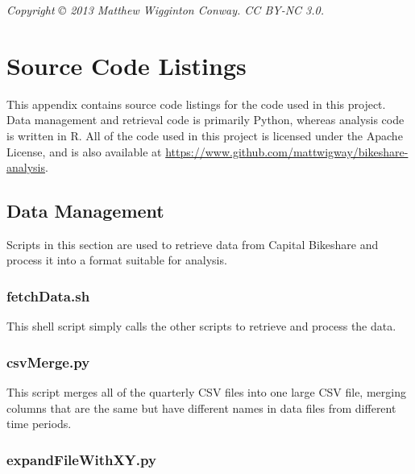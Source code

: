 \documentclass[letterpaper,11pt]{article}
\begin{document}
\clearpage\newpage
\printbibliography

\vspace{25em}

\emph{Copyright © 2013 Matthew Wigginton Conway. CC BY-NC 3.0.}

\newpage
{}
\fancyhfoffset[E,O]{0pt}
\appendix
\section{Source Code Listings}

This appendix contains source code listings for the code used in this
project. Data management and retrieval code is primarily Python,
whereas analysis code is written in R. All of the code used in this
project is licensed under the Apache License, and is also available at
\url{https://www.github.com/mattwigway/bikeshare-analysis}.

\subsection{Data Management}

Scripts in this section are used to retrieve data from Capital
Bikeshare and process it into a format suitable for analysis.

\subsubsection{fetchData.sh}
\label{fetchData.sh}

This shell script simply calls the other scripts to retrieve and
process the data.



\subsubsection{csvMerge.py}
\label{csvMerge.py}

This script merges all of the quarterly CSV files into one large CSV
file, merging columns that are the same but have different names in
data files from different time periods.



\subsubsection{expandFileWithXY.py}
\label{expandFileWithXY.py}
\end{document}

